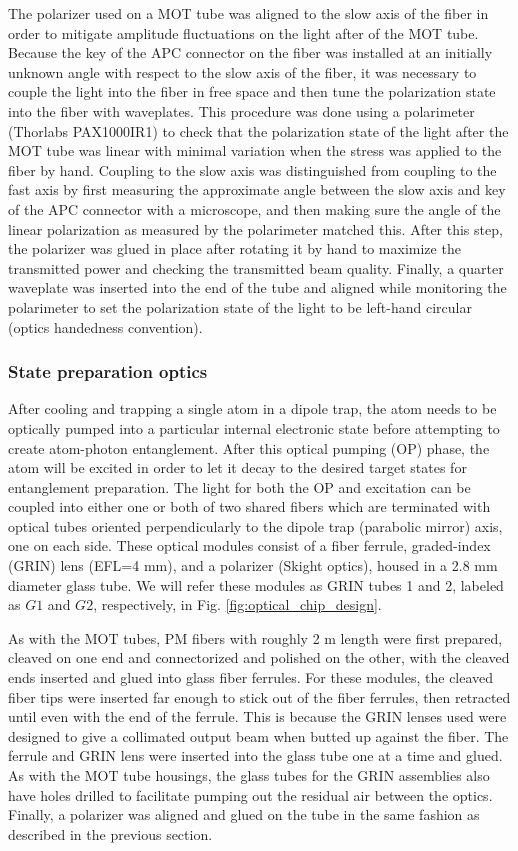 The polarizer used on a MOT tube was aligned to the slow axis of the fiber in order to mitigate amplitude fluctuations on the light after of the MOT tube. Because the key of the APC connector on the fiber was installed at an initially unknown angle with respect to the slow axis of the fiber, it was necessary to couple the light into the fiber in free space and then tune the polarization state into the fiber with waveplates. This procedure was done using a polarimeter (Thorlabs PAX1000IR1) to check that the polarization state of the light after the MOT tube was linear with minimal variation when the stress was applied to the fiber by hand. Coupling to the slow axis was distinguished from coupling to the fast axis by first measuring the approximate angle between the slow axis and key of the APC connector with a microscope, and then making sure the angle of the linear polarization as measured by the polarimeter matched this. After this step, the polarizer was glued in place after rotating it by hand to maximize the transmitted power and checking the transmitted beam quality. Finally, a quarter waveplate was inserted into the end of the tube and aligned while monitoring the polarimeter to set the polarization state of the light to be left-hand circular (optics handedness convention).

\subsubsection{State preparation optics}

After cooling and trapping a single atom in a dipole trap, the atom needs to be optically pumped into a particular internal electronic state before attempting to create atom-photon entanglement. After this optical pumping (OP) phase, the atom will be excited in order to let it decay to the desired target states for entanglement preparation. The light for both the OP and excitation can be coupled into either one or both of two shared fibers which are terminated with optical tubes oriented perpendicularly to the dipole trap (parabolic mirror) axis, one on each side. These optical modules consist of a fiber ferrule, graded-index (GRIN) lens (EFL=4 mm), and a polarizer (Skight optics), housed in a 2.8 mm diameter glass tube. We will refer these modules as GRIN tubes 1 and 2, labeled as $G1$ and $G2$, respectively, in Fig. \ref{fig:optical_chip_design}.

As with the MOT tubes, PM fibers with roughly 2 m length were first prepared, cleaved on one end and connectorized and polished on the other, with the cleaved ends inserted and glued into glass fiber ferrules. For these modules, the cleaved fiber tips were inserted far enough to stick out of the fiber ferrules, then retracted until even with the end of the ferrule. This is because the GRIN lenses used were designed to give a collimated output beam when butted up against the fiber. The ferrule and GRIN lens were inserted into the glass tube one at a time and glued. As with the MOT tube housings, the glass tubes for the GRIN assemblies also have holes drilled to facilitate pumping out the residual air between the optics. Finally, a polarizer was aligned and glued on the tube in the same fashion as described in the previous section. 

